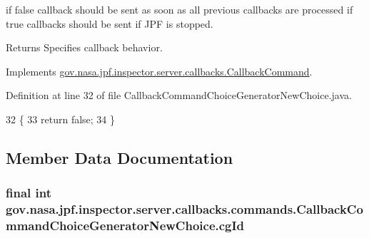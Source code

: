 if false callback should be sent as soon as all previous callbacks are processed if true callbacks should be sent if J\+PF is stopped. 

\begin{DoxyReturn}{Returns}
Specifies callback behavior. 
\end{DoxyReturn}


Implements \hyperlink{interfacegov_1_1nasa_1_1jpf_1_1inspector_1_1server_1_1callbacks_1_1_callback_command_a156477000bc705d78978af529e60fc5a}{gov.\+nasa.\+jpf.\+inspector.\+server.\+callbacks.\+Callback\+Command}.



Definition at line 32 of file Callback\+Command\+Choice\+Generator\+New\+Choice.\+java.


\begin{DoxyCode}
32                                  \{
33     \textcolor{keywordflow}{return} \textcolor{keyword}{false};
34   \}
\end{DoxyCode}


\subsection{Member Data Documentation}
\subsubsection[{\texorpdfstring{cg\+Id}{cgId}}]{\setlength{\rightskip}{0pt plus 5cm}final int gov.\+nasa.\+jpf.\+inspector.\+server.\+callbacks.\+commands.\+Callback\+Command\+Choice\+Generator\+New\+Choice.\+cg\+Id\hspace{0.3cm}{\ttfamily [private]}}\hypertarget{classgov_1_1nasa_1_1jpf_1_1inspector_1_1server_1_1callbacks_1_1commands_1_1_callback_command_choice_generator_new_choice_a797f09a910d1b8c7c90e0bc97a9a4e30}{}\label{classgov_1_1nasa_1_1jpf_1_1inspector_1_1server_1_1callbacks_1_1commands_1_1_callback_command_choice_generator_new_choice_a797f09a910d1b8c7c90e0bc97a9a4e30}



